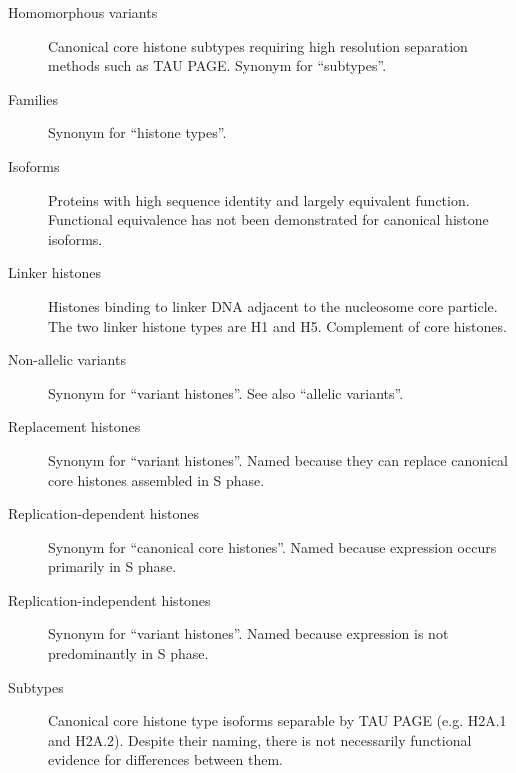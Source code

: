 {\begin{shaded}
\begin{description}
        \item[Homomorphous variants] \hfill \newline
        Canonical core histone subtypes
        requiring high resolution separation methods such as TAU PAGE.
        Synonym for ``subtypes''.

        \item[Families] \hfill \newline
        Synonym for ``histone types''.

        \item[Isoforms] \hfill \newline
        Proteins with high sequence identity and largely equivalent function.
        Functional equivalence has not been demonstrated for canonical histone isoforms.

        \item[Linker histones] \hfill \newline
        Histones binding to linker DNA adjacent to the nucleosome core particle.
        The two linker histone types are H1 and H5. Complement of core histones.

        \item[Non-allelic variants] \hfill \newline
        Synonym for ``variant histones''. See also ``allelic variants''.

        \item[Replacement histones] \hfill \newline
        Synonym for ``variant histones''.
        Named because they can replace canonical core histones assembled in S phase.

        \item[Replication-dependent histones] \hfill \newline
        Synonym for ``canonical core histones''.
        Named because expression occurs primarily in S phase.

        \item[Replication-independent histones] \hfill \newline
        Synonym for ``variant histones''.
        Named because expression is not predominantly in S phase.

        \item[Subtypes] \hfill \newline
        Canonical core histone type isoforms separable by TAU PAGE
        (e.g. H2A.1 and H2A.2).  Despite their naming, there is not necessarily functional evidence
        for differences between them.


\end{description}
\end{shaded}}
